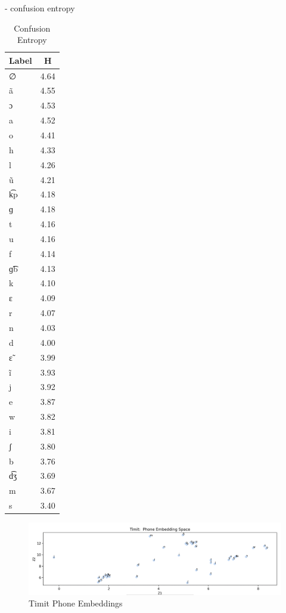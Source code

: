 \documentclass[11pt]{article}
\newcommand{\ipa}[1]{{\ipafont #1}}
\begin{document}
{- confusion entropy
\begin{table}[h!]
\centering
\caption{Confusion Entropy}
\begin{tabular}{lc}
\toprule
\textbf{Label} & \textbf{H} \\
\midrule
\ipa{∅}    & 4.64 \\
\ipa{ã}   & 4.55 \\
\ipa{ɔ}    & 4.53 \\
\ipa{a}    & 4.52 \\
\ipa{o}    & 4.41 \\
\ipa{h}    & 4.33 \\
\ipa{l}    & 4.26 \\
\ipa{ũ}   & 4.21 \\
\ipa{k͡p}  & 4.18 \\
\ipa{ɡ}    & 4.18 \\
\ipa{t}    & 4.16 \\
\ipa{u}    & 4.16 \\
\ipa{f}    & 4.14 \\
\ipa{ɡ͡b}  & 4.13 \\
\ipa{k}    & 4.10 \\
\ipa{ɛ}    & 4.09 \\
\ipa{r}    & 4.07 \\
\ipa{n}    & 4.03 \\
\ipa{d}    & 4.00 \\
\ipa{ɛ̃}   & 3.99 \\
\ipa{ĩ}   & 3.93 \\
\ipa{j}    & 3.92 \\
\ipa{e}    & 3.87 \\
\ipa{w}    & 3.82 \\
\ipa{i}    & 3.81 \\
\ipa{ʃ}    & 3.80 \\
\ipa{b}    & 3.76 \\
\ipa{d͡ʒ}  & 3.69 \\
\ipa{m}    & 3.67 \\
\ipa{s}    & 3.40 \\
\bottomrule
\end{tabular}
\end{table}

\begin{figure}
    \centering
    \includegraphics[width=1\linewidth]{Timit_embeddings.png}
    \caption{Timit Phone Embeddings}
    \label{fig:placeholder}
\end{figure}

}
\end{document}
